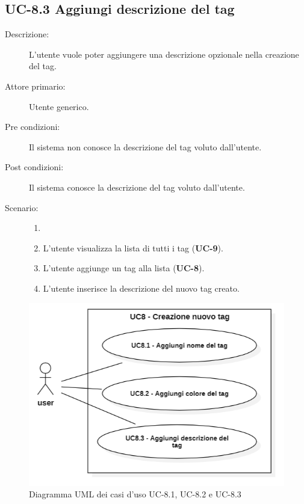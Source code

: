 \subsection{UC-8.3 Aggiungi descrizione del tag}
\begin{description}
    \item[Descrizione:] L’utente vuole poter aggiungere una descrizione opzionale nella creazione del tag.
    \item[Attore primario:] Utente generico.
    \item[Pre condizioni:] Il sistema non conosce la descrizione  del tag voluto dall’utente.
    \item[Post condizioni:] Il sistema conosce la descrizione del tag voluto dall’utente.
    \item[Scenario:]
    \begin{enumerate}
        \item[]
        \item L’utente visualizza la lista di tutti i tag (\textbf{UC-9}).
        \item L'utente aggiunge un tag alla lista (\textbf{UC-8}).
        \item L'utente inserisce la descrizione del nuovo tag creato.
    \end{enumerate}
\end{description}
\begin{figure}[H]
    \centering
    \includegraphics[width=0.8\linewidth]{UC8.1.png} 
    \caption{Diagramma UML dei casi d'uso UC-8.1, UC-8.2 e UC-8.3}
    \label{fig:UC7.1-2-3}
\end{figure}

